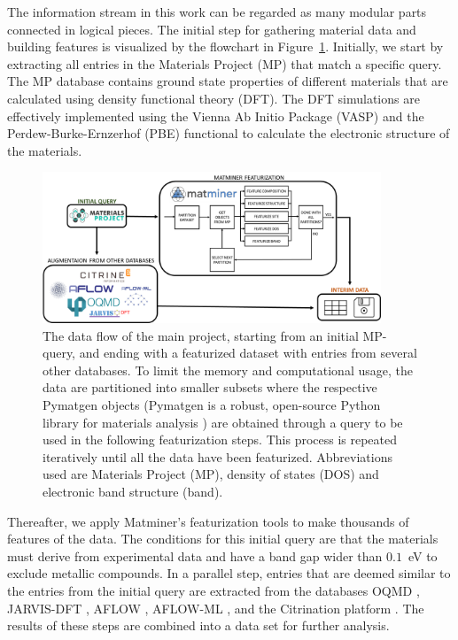 \documentclass[superscriptaddress,unsortedaddress,
 amsmath,amssymb,
 aps,
]{revtex4-2}
\begin{document}
The information stream in this work can be regarded as many modular parts connected in logical pieces. The initial step for gathering material data and building features is visualized by the  flowchart in Figure~\ref{fig:flowchart}. 
Initially, we start by extracting all entries in
the Materials Project (MP) that match a specific query. 
The MP database contains ground state properties of different materials that are calculated using density functional theory (DFT). The DFT simulations are effectively implemented using the Vienna Ab Initio Package (VASP) \cite{Kresse1996} and the  Perdew-Burke-Ernzerhof \cite{Perdew1996} (PBE) functional to calculate the electronic structure of the materials. 

\begin{figure}[t]
    \centering
    \includegraphics[width=0.9\textwidth]{figures/flow_chart.png}
    \caption{
        The data flow of the main project, starting from an initial MP-query, and ending with a featurized dataset
        with entries from several other databases. To limit the memory and computational usage, the data are
        partitioned into smaller subsets where the respective Pymatgen objects (Pymatgen is a robust, open-source Python library for materials analysis \cite{pymatgen}) are obtained through a query to be used in
        the following featurization steps. This process is repeated iteratively until all the data have been featurized.
        Abbreviations used are Materials Project (MP), density of states (DOS) and electronic band structure (band).
    }
    \label{fig:flowchart}
\end{figure}

% 

% 

Thereafter, we apply Matminer’s \cite{Ward2018}
featurization tools to make thousands of features of the data. The conditions for this initial query are that the materials must derive from experimental data and have a band gap wider than $0.1$~eV to exclude metallic compounds. In a parallel step, entries that are deemed
similar to the entries from the initial query
are extracted from the databases OQMD \cite{Saal2013,Kirklin2015}, JARVIS-DFT \cite{Choudhary2020}, AFLOW \cite{Curtarolo2012, Curtarolo2012a, Calderon2015}, AFLOW-ML \cite{Isayev2017}, and the Citrination platform \cite{OMaraJordan2016MDIA}. The results of these steps are combined into a data set for further analysis. 
\end{document}
